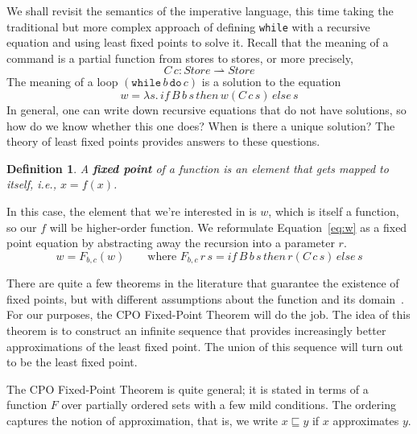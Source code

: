 \documentclass{tufte-handout}
\newcommand{\LAM}[1]{\lambda #1.\,}
\newcommand{\WHILE}[2]{\mathtt{while}\,#1\,\mathtt{do}\,#2}
\newcommand{\pto}[0]{\rightharpoonup}
\newcommand{\STORE}[0]{\mathit{Store}}
\newtheorem{definition}{Definition}%
\begin{document}

We shall revisit the semantics of the imperative language, this time
taking the traditional but more complex approach of defining
\texttt{while} with a recursive equation and using least fixed points
to solve it. Recall that the meaning of a command is a partial
function from stores to stores, or more precisely,
\[
C\,c : \STORE \pto \STORE
\]
The meaning of a loop $(\WHILE{b}{c})$ is a solution to the
equation
\begin{equation}
\label{eq:w}
w = \LAM{s}\mathit{if}\, B\,b\,s \,\mathit{then}\, w(C\,c\,s)\,\mathit{else}\,s
\end{equation}
In general, one can write down recursive equations that do not have
solutions, so how do we know whether this one does?  When is there a
unique solution? The theory of least fixed points provides answers to
these questions.

\begin{definition}
A \textbf{\emph{fixed point}} of a function is an element that gets
mapped to itself, i.e., $x = f(x)$.
\end{definition}

In this case, the element that we're interested in is $w$, which is
itself a function, so our $f$ will be higher-order function. We
reformulate Equation~\ref{eq:w} as a fixed point equation by
abstracting away the recursion into a parameter $r$.
\begin{equation} \label{eq:while}
  w = F_{b,c}(w)
  \qquad
  \text{where }
  F_{b,c}\,r\,s = \mathit{if}\, B\,b\,s \,\mathit{then}\, r(C\,c\,s)\,\mathit{else}\,s
\end{equation}

There are quite a few theorems in the literature that guarantee the
existence of fixed points, but with different assumptions about the
function and its domain~\citep{Lassez:1982aa}. For our purposes, the
CPO Fixed-Point Theorem will do the job. The idea of this theorem is
to construct an infinite sequence that provides increasingly better
approximations of the least fixed point. The union of this sequence
will turn out to be the least fixed point.

The CPO Fixed-Point Theorem is quite general; it is stated in terms of
a function $F$ over partially ordered sets with a few mild conditions.
The ordering captures the notion of approximation, that is, we write
$x \sqsubseteq y$ if $x$ approximates $y$.
\end{document}
